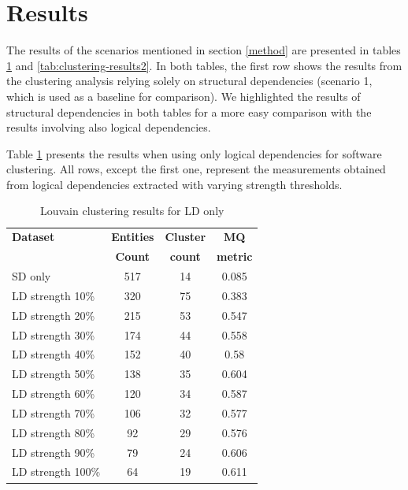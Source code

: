 \documentclass[conference]{IEEEtran}
\begin{document}
\section{Results}
\label{results}


The results of the scenarios mentioned in section \ref{method} are presented in tables \ref{tab:clustering-results1} and \ref{tab:clustering-results2}.
 In both tables, the first row shows the results from the clustering analysis relying solely on structural dependencies (scenario 1, which is used as a baseline for comparison). We highlighted the results of structural dependencies in both tables for a more easy comparison with the results involving also logical dependencies.

Table \ref{tab:clustering-results1} presents the results when using only logical dependencies for software clustering. All rows, except the first one, represent the measurements obtained from logical dependencies extracted with varying strength thresholds.


\begin{table}[htbp]
  \centering
  \caption{Louvain clustering results for LD only}
  \label{tab:clustering-results1}
  \begin{tabular}{lc|c|c}
    \toprule
    \textbf{Dataset} & \textbf{Entities} & \textbf{Cluster} & \textbf{MQ } \\
    & \textbf{Count} & \textbf{count} &  \textbf{metric} \\
    \midrule
    SD only & 517 & 14 &  0.085  \\
    \midrule
LD  strength    10\%    &   320 &   75  &   0.383   \\
LD  strength    20\%    &   215 &   53  &   0.547   \\
LD  strength    30\%    &   174 &   44  &   0.558   \\
LD  strength    40\%    &   152 &   40  &   0.58    \\
LD  strength    50\%    &   138 &   35  &   0.604   \\
LD  strength    60\%    &   120 &   34  &   0.587   \\
LD  strength    70\%    &   106 &   32  &   0.577   \\
LD  strength    80\%    &   92  &   29  &   0.576   \\
LD  strength    90\%    &   79  &   24  &   0.606   \\
LD  strength    100\%   &   64  &   19  &   0.611   \\
    \bottomrule
  \end{tabular}
\end{table}
\end{document}
